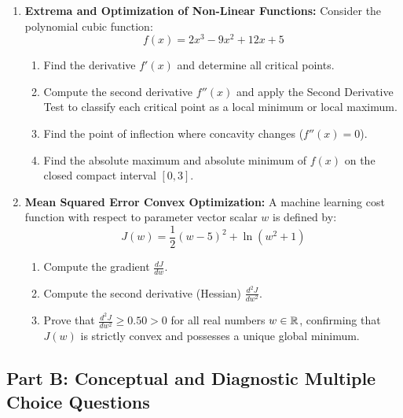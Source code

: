 \begin{enumerate}
    \item \textbf{Extrema and Optimization of Non-Linear Functions:} Consider the polynomial cubic function:
    $$f(x) = 2x^3 - 9x^2 + 12x + 5$$
    \begin{enumerate}
        \item Find the derivative $f'(x)$ and determine all critical points.
        \item Compute the second derivative $f''(x)$ and apply the Second Derivative Test to classify each critical point as a local minimum or local maximum.
        \item Find the point of inflection where concavity changes ($f''(x) = 0$).
        \item Find the absolute maximum and absolute minimum of $f(x)$ on the closed compact interval $[0, 3]$.
    \end{enumerate}

    \item \textbf{Mean Squared Error Convex Optimization:} A machine learning cost function with respect to parameter vector scalar $w$ is defined by:
    $$J(w) = \frac{1}{2}(w - 5)^2 + \ln(w^2 + 1)$$
    \begin{enumerate}
        \item Compute the gradient $\frac{dJ}{dw}$.
        \item Compute the second derivative (Hessian) $\frac{d^2 J}{dw^2}$.
        \item Prove that $\frac{d^2 J}{dw^2} \ge 0.50 > 0$ for all real numbers $w \in \mathbb{R}$, confirming that $J(w)$ is strictly convex and possesses a unique global minimum.
    \end{enumerate}
\end{enumerate}

\subsection*{Part B: Conceptual and Diagnostic Multiple Choice Questions}

